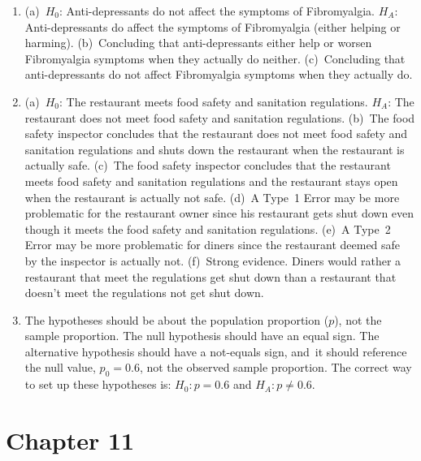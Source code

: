 \documentclass[
  10pt,
  openany]{book}
\providecommand{\tightlist}{%
  \setlength{\itemsep}{0pt}\setlength{\parskip}{0pt}}
\begin{document}
\begin{enumerate}
\def\labelenumi{\arabic{enumi}.}
\tightlist
\item
  (a)~\(H_0\): Anti-depressants do not affect the symptoms of Fibromyalgia. \(H_A\): Anti-depressants do affect the symptoms of Fibromyalgia (either helping or harming). (b)~Concluding that anti-depressants either help or worsen Fibromyalgia symptoms when they actually do neither. (c)~Concluding that anti-depressants do not affect Fibromyalgia symptoms when they actually do.

  \addtocounter{enumi}{1}
\item
  (a)~\(H_0\): The restaurant meets food safety and sanitation regulations. \(H_A\): The restaurant does not meet food safety and sanitation regulations. (b)~The food safety inspector concludes that the restaurant does not meet food safety and sanitation regulations and shuts down the restaurant when the restaurant is actually safe. (c)~The food safety inspector concludes that the restaurant meets food safety and sanitation regulations and the restaurant stays open when the restaurant is actually not safe. (d)~A Type~1 Error may be more problematic for the restaurant owner since his restaurant gets shut down even though it meets the food safety and sanitation regulations. (e)~A Type~2 Error may be more problematic for diners since the restaurant deemed safe by the inspector is actually not. (f)~Strong evidence. Diners would rather a restaurant that meet the regulations get shut down than a restaurant that doesn't meet the regulations not get shut down.

  \addtocounter{enumi}{1}
\item
  The hypotheses should be about the population proportion (\(p\)), not the sample proportion. The null hypothesis should have an equal sign. The alternative hypothesis should have a not-equals sign, and~it should reference the null value, \(p_0 = 0.6\), not the observed sample proportion. The correct way to set up these hypotheses is: \(H_0: p = 0.6\) and \(H_A: p \neq 0.6\).

  \addtocounter{enumi}{1}
\end{enumerate}

\hypertarget{exercise-solutions-16}{%
\section{Chapter 11}\label{exercise-solutions-16}}
\end{document}
